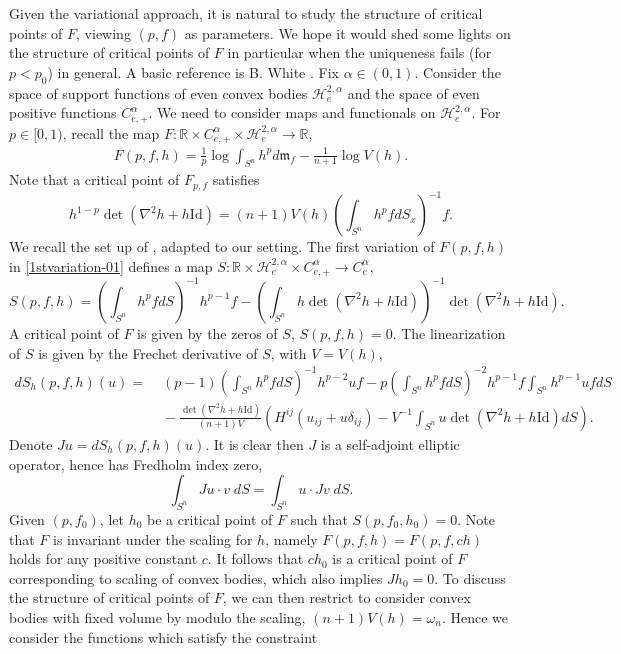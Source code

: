 \documentclass[reqno]{amsart}
\theoremstyle{remark}
\def\R{\mathbb{R}}
\def\cH{{\mathcal H}}
\theoremstyle{plain}
\begin{document}
Given the variational approach, it is natural to study the structure of critical points of $F$, viewing $(p, f)$ as parameters.
We hope it would shed some lights on the structure of critical points of $F$ in particular when the uniqueness fails (for $p<p_0$) in general. 
A basic reference is B. White \cite{White91}.
Fix $\alpha\in (0, 1)$. 
Consider the space of support functions of even convex bodies  $\cH_e^{2, \alpha}$ and the space of even positive functions $C^\alpha_{e, +}$.
We need to consider maps and functionals on $\cH_e^{2, \alpha}$. For $p\in [0, 1)$, recall the map $F: \R\times C^\alpha_{e, +}\times\cH_e^{2, \alpha}\rightarrow \R,$
\[
\begin{split}
  F(p, f, h)=\frac{1}{p}\log \int_{S^n} h^p d\mathfrak{m}_f-\frac{1}{n+1}\log V(h).
\end{split}
\]
Note that a critical point of $F_{p, f}$ satisfies
\begin{equation}\label{normalized-01}
     h^{1-p}\det(\nabla^2 h+h\text{Id})=(n+1)V(h) \left(\int_{S^n}h^pfdS_x\right)^{-1}f.
\end{equation}
 We recall the set up of \cite[Section 1]{White91}, adapted to our setting.  The first variation  of $F(p, f, h)$ in \eqref{1stvariation-01} defines a map $S: \R\times \cH^{2, \alpha}_e\times C^\alpha_{e, +}\rightarrow C^\alpha_e,$
\begin{equation}
 S(p, f, h)=\left(\int_{S^n}h^p fdS\right)^{-1}h^{p-1}f-\left(\int_{S^n} h\det(\nabla^2 h+h\text{Id})\right)^{-1}\det(\nabla^2 h+h\text{Id}).
\end{equation}
A critical point of $F$ is given by the zeros of $S$, $S(p, f, h)=0$. The linearization of $S$ is given by the Frechet derivative of $S$, with $V=V(h)$, 
\begin{equation}
\begin{split}
     dS_h(p, f, h)(u)=&\;(p-1) \left(\int_{S^n}h^p fdS\right)^{-1}h^{p-2} uf-p\left(\int_{S^n}h^p fdS\right)^{-2}h^{p-1}f \int_{S^n} h^{p-1} uf dS\\
     &\;-\frac{\det(\nabla^2 h+h\text{Id})}{(n+1)V} \left(H^{ij}(u_{ij}+u\delta_{ij})-V^{-1}\int_{S^n} u\det(\nabla^2 h+h\text{Id})dS\right).
\end{split}
\end{equation}
Denote $Ju=dS_{h}(p, f, h)(u)$. It is clear then $J$ is a self-adjoint elliptic operator, hence has Fredholm index zero,
\[
\int_{S^n} Ju\cdot  v\; dS=\int_{S^n} u \cdot Jv\; dS.
\]
Given $(p, f_0)$, let $h_0$ be a critical point of $F$ such that $S(p, f_0, h_0)=0$. Note that $F$ is invariant under the scaling for $h$, namely $F(p, f, h)=F(p, f, ch)$ holds for any positive constant $c$. It follows that $ch_0$ is a critical point of $F$ corresponding to scaling of convex bodies, which also implies $J h_0=0$. To discuss the structure of critical points of $F$, we can then restrict to consider convex bodies with fixed volume by modulo the scaling, $(n+1)V(h)=\omega_n$. Hence we consider the functions which satisfy the constraint
\end{document}
